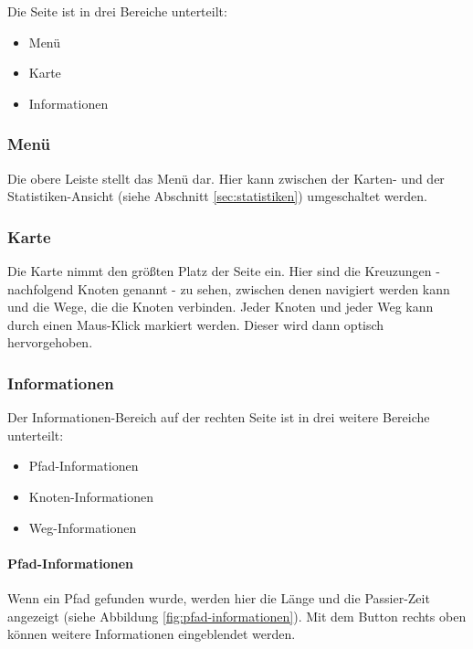 \documentclass[
  a4paper,
  10pt
]{scrreprt}
\begin{document}
Die Seite ist in drei Bereiche unterteilt:

\begin{itemize}
  \item Menü
  \item Karte
  \item Informationen
\end{itemize}

\subsubsection{Menü}
\label{sec:menue}

Die obere Leiste stellt das Menü dar.
Hier kann zwischen der Karten- und der Statistiken-Ansicht (siehe Abschnitt \ref{sec:statistiken}) umgeschaltet werden.

\subsubsection{Karte}
\label{sec:karte}

Die Karte nimmt den größten Platz der Seite ein.
Hier sind die Kreuzungen - nachfolgend Knoten genannt - zu sehen, zwischen denen navigiert werden kann und die Wege, die die Knoten verbinden.
Jeder Knoten und jeder Weg kann durch einen Maus-Klick markiert werden.
Dieser wird dann optisch hervorgehoben.

\subsubsection{Informationen}
\label{sec:informationen}

Der Informationen-Bereich auf der rechten Seite ist in drei weitere Bereiche unterteilt:

\begin{itemize}
  \item Pfad-Informationen
  \item Knoten-Informationen
  \item Weg-Informationen
\end{itemize}

\paragraph{Pfad-Informationen}
\label{sec:pfad-informationen}

Wenn ein Pfad gefunden wurde, werden hier die Länge und die Passier-Zeit angezeigt (siehe Abbildung \ref{fig:pfad-informationen}).
Mit dem Button rechts oben können weitere Informationen eingeblendet werden.
\end{document}
